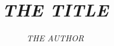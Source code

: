 \documentclass[
]{uhull_dcs_thesis}
\title            {{\em THE TITLE}}
\author           {{\em THE AUTHOR}}
\begin{document}
\frontmatter

\begin{spacing}{1}
  \maketitle
  
  \tableofcontents
\end{spacing}

\mainmatter







\appendix




\backmatter

\begin{spacing}{1}
  
\end{spacing}
\end{document}
